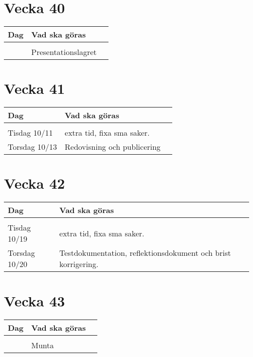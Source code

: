 \documentclass{TDP003mall}
\begin{document}
\section{Vecka 40}
\begin{table}[!h]
\begin{tabularx}{\linewidth}{|l|X|l|}
\hline
Dag & Vad ska göras \\\hline
& \\\hline
& Presentationslagret\\\hline
\end{tabularx}
\end{table}

\section{Vecka 41}
\begin{table}[!h]
\begin{tabularx}{\linewidth}{|l|X|l|}
\hline
Dag & Vad ska göras \\\hline
& \\\hline
Tisdag 10/11 & extra tid, fixa sma saker.\\\hline
Torsdag 10/13 & Redovisning och publicering\\\hline
\end{tabularx}
\end{table}
\pagebreak

\section{Vecka 42}
\begin{table}[!h]
\begin{tabularx}{\linewidth}{|l|X|l|}
\hline
Dag & Vad ska göras \\\hline
& \\\hline
Tisdag 10/19 & extra tid, fixa sma saker.\\\hline
Torsdag 10/20 & Testdokumentation, reflektionsdokument och brist korrigering. \\\hline
\end{tabularx}
\end{table}

\section{Vecka 43}
\begin{table}[!h]
\begin{tabularx}{\linewidth}{|l|X|l|}
\hline
Dag & Vad ska göras \\\hline
& \\\hline
& Munta \\\hline
\end{tabularx}
\end{table}
\end{document}
